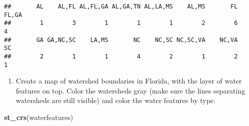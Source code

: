 \documentclass[]{article}
\newenvironment{Shaded}{\begin{snugshade}}{\end{snugshade}}
\newcommand{\KeywordTok}[1]{\textcolor[rgb]{0.13,0.29,0.53}{\textbf{#1}}}
\newcommand{\NormalTok}[1]{#1}
\newcommand{\OperatorTok}[1]{\textcolor[rgb]{0.81,0.36,0.00}{\textbf{#1}}}
\newcommand{\StringTok}[1]{\textcolor[rgb]{0.31,0.60,0.02}{#1}}
\providecommand{\tightlist}{%
  \setlength{\itemsep}{0pt}\setlength{\parskip}{0pt}}
\begin{document}
\begin{Shaded}
\end{Shaded}

\begin{verbatim}
##       AL    AL,FL AL,FL,GA AL,GA,TN AL,LA,MS    AL,MS       FL    FL,GA 
##        1        3        1        1        1        2        6        4 
##       GA GA,NC,SC    LA,MS       NC    NC,SC NC,SC,VA    NC,VA       SC 
##        2        1        1        4        2        1        2        1
\end{verbatim}

\begin{Shaded}
\end{Shaded}

\begin{enumerate}
\def\labelenumi{\arabic{enumi}.}
\setcounter{enumi}{10}
\tightlist
\item
  Create a map of watershed boundaries in Florida, with the layer of
  water features on top. Color the watersheds gray (make sure the lines
  separating watersheds are still visible) and color the water features
  by type.
\end{enumerate}

\begin{Shaded}
\begin{Highlighting}[]
\KeywordTok{st_crs}\NormalTok{(waterfeatures)}
\end{Highlighting}
\end{Shaded}
\end{document}
